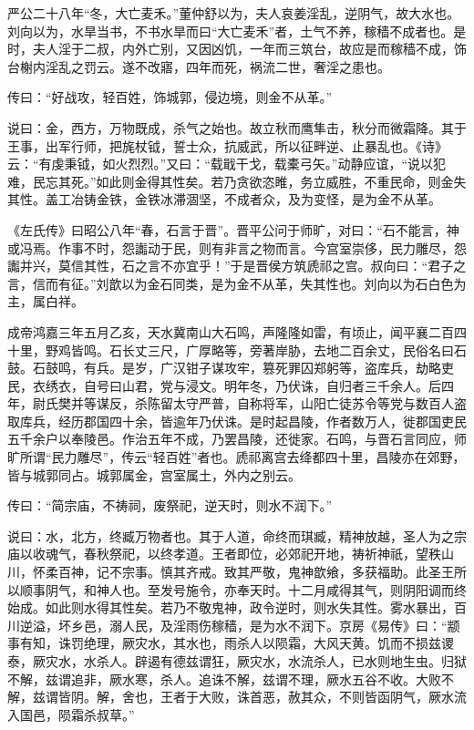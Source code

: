 \documentclass[12pt,UTF8]{ctexbook}
\begin{document}
严公二十八年“冬，大亡麦禾。”董仲舒以为，夫人哀姜淫乱，逆阴气，故大水也。刘向以为，水旱当书，不书水旱而曰“大亡麦禾”者，土气不养，稼穑不成者也。是时，夫人淫于二叔，内外亡别，又因凶饥，一年而三筑台，故应是而稼穑不成，饰台榭内淫乱之罚云。遂不改寤，四年而死，祸流二世，奢淫之患也。



传曰：“好战攻，轻百姓，饰城郭，侵边境，则金不从革。”



说曰：金，西方，万物既成，杀气之始也。故立秋而鹰隼击，秋分而微霜降。其于王事，出军行师，把旄杖钺，誓士众，抗威武，所以征畔逆、止暴乱也。《诗》云：“有虔秉钺，如火烈烈。”又曰：“载戢干戈，载橐弓矢。”动静应谊，“说以犯难，民忘其死。”如此则金得其性矣。若乃贪欲恣睢，务立威胜，不重民命，则金失其性。盖工冶铸金铁，金铁冰滞涸坚，不成者众，及为变怪，是为金不从革。



《左氏传》曰昭公八年“春，石言于晋”。晋平公问于师旷，对曰：“石不能言，神或冯焉。作事不时，怨讟动于民，则有非言之物而言。今宫室崇侈，民力雕尽，怨讟并兴，莫信其性，石之言不亦宜乎！”于是晋侯方筑虒祁之宫。叔向曰：“君子之言，信而有征。”刘歆以为金石同类，是为金不从革，失其性也。刘向以为石白色为主，属白祥。



成帝鸿嘉三年五月乙亥，天水冀南山大石鸣，声隆隆如雷，有顷止，闻平襄二百四十里，野鸡皆鸣。石长丈三尺，广厚略等，旁著岸胁，去地二百余丈，民俗名曰石鼓。石鼓鸣，有兵。是岁，广汉钳子谋攻牢，篡死罪囚郑躬等，盗库兵，劫略吏民，衣绣衣，自号曰山君，党与浸文。明年冬，乃伏诛，自归者三千余人。后四年，尉氏樊并等谋反，杀陈留太守严普，自称将军，山阳亡徒苏令等党与数百人盗取库兵，经历郡国四十余，皆逾年乃伏诛。是时起昌陵，作者数万人，徙郡国吏民五千余户以奉陵邑。作治五年不成，乃罢昌陵，还徙家。石鸣，与晋石言同应，师旷所谓“民力雕尽”，传云“轻百姓”者也。虒祁离宫去绛都四十里，昌陵亦在郊野，皆与城郭同占。城郭属金，宫室属土，外内之别云。



传曰：“简宗庙，不祷祠，废祭祀，逆天时，则水不润下。”



说曰：水，北方，终臧万物者也。其于人道，命终而琪臧，精神放越，圣人为之宗庙以收魂气，春秋祭祀，以终孝道。王者即位，必郊祀开地，祷祈神祇，望秩山川，怀柔百神，记不宗事。慎其齐戒。致其严敬，鬼神歆飨，多获福助。此圣王所以顺事阴气，和神人也。至发号施令，亦奉天时。十二月咸得其气，则阴阳调而终始成。如此则水得其性矣。若乃不敬鬼神，政令逆时，则水失其性。雾水暴出，百川逆溢，坏乡邑，溺人民，及淫雨伤稼穑，是为水不润下。京房《易传》曰：“颛事有知，诛罚绝理，厥灾水，其水也，雨杀人以陨霜，大风天黄。饥而不损兹谡泰，厥灾水，水杀人。辟遏有德兹谓狂，厥灾水，水流杀人，已水则地生虫。归狱不解，兹谓追非，厥水寒，杀人。追诛不解，兹谓不理，厥水五谷不收。大败不解，兹谓皆阴。解，舍也，王者于大败，诛首恶，赦其众，不则皆函阴气，厥水流入国邑，陨霜杀叔草。”
\end{document}
